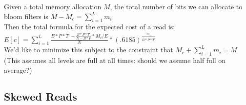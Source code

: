 \documentclass[11pt]{article}
\theoremstyle{plain}
\theoremstyle{definition}
\begin{document}
Given a total memory allocation $M$, the total number of bits we can allocate to bloom filters is $M-M_c = \sum_{i=1}^L m_i$ \\
Then the total formula for the expected cost of a read is: \\
$E[c] = \sum_{i=1}^{L} \frac{B*P*T^i - \frac{B*P*T^i}{N-B*P} * M_c/E}{N} * (.6185) ^  {\frac{m_i}{B*P*T^i}}$ \\
We'd like to minimize this subject to the constraint that $M_c + \sum_{i=1}^L m_i = M$ \\
(This assumes all levels are full at all times: should we assume half full on average?)

\subsection{Skewed Reads}
\end{document}
